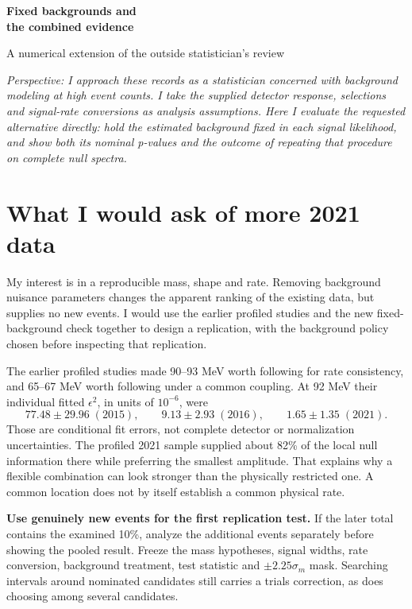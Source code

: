 \documentclass[11pt]{article}
\begin{document}
\begin{center}{\LARGE\bfseries Fixed backgrounds and\\the combined evidence}\par\vspace{7pt}
{\large A numerical extension of the outside statistician's review}
\end{center}
\noindent\textit{Perspective: I approach these records as a statistician concerned with background modeling at high event counts. I take the supplied detector response, selections and signal-rate conversions as analysis assumptions. Here I evaluate the requested alternative directly: hold the estimated background fixed in each signal likelihood, and show both its nominal p-values and the outcome of repeating that procedure on complete null spectra.}

\clearpage
\section*{What I would ask of more 2021 data}
My interest is in a reproducible mass, shape and rate. Removing background nuisance parameters changes the apparent ranking of the existing data, but supplies no new events. I would use the earlier profiled studies and the new fixed-background check together to design a replication, with the background policy chosen before inspecting that replication.

The earlier profiled studies made 90--93 MeV worth following for rate consistency, and 65--67 MeV worth following under a common coupling. At 92 MeV their individual fitted $\epsilon^2$, in units of $10^{-6}$, were
\[
77.48\pm29.96\;(2015),\qquad9.13\pm2.93\;(2016),\qquad1.65\pm1.35\;(2021).
\]
Those are conditional fit errors, not complete detector or normalization uncertainties. The profiled 2021 sample supplied about 82\% of the local null information there while preferring the smallest amplitude. That explains why a flexible combination can look stronger than the physically restricted one. A common location does not by itself establish a common physical rate.

\textbf{Use genuinely new events for the first replication test.} If the later total contains the examined 10\%, analyze the additional events separately before showing the pooled result. Freeze the mass hypotheses, signal widths, rate conversion, background treatment, test statistic and $\pm2.25\sigma_m$ mask. Searching intervals around nominated candidates still carries a trials correction, as does choosing among several candidates.
\end{document}
